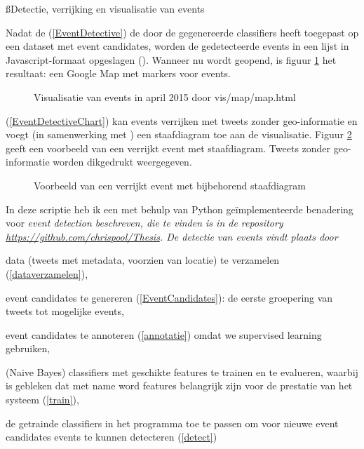 {{\ss{Detectie, verrijking en visualisatie van events}\label{detvervis}

Nadat de  (\ref{EventDetective}) de door de  gegenereerde classifiers heeft 
toegepast op een dataset met event candidates, worden de gedetecteerde events in een lijst in Javascript-formaat 
opgeslagen (). Wanneer nu  wordt geopend, is figuur \ref{standaardvis} het resultaat: een Google Map met
markers voor events.

\begin{figure}[H]
  \centering
    \caption{Visualisatie van events in april 2015 door vis/map/map.html}
  \label{standaardvis}
\end{figure}

 (\ref{EventDetectiveChart}) kan events verrijken met tweets zonder geo-informatie en voegt (in samenwerking
met ) een staafdiagram toe aan de visualisatie. Figuur \ref{verrijk} geeft een voorbeeld van een verrijkt event met staafdiagram.
Tweets zonder geo-informatie worden dikgedrukt weergegeven.

\begin{figure}[H]
  \centering
    \caption{Voorbeeld van een verrijkt event met bijbehorend staafdiagram}
  \label{verrijk}
\end{figure}

\label{conclusie}

In deze scriptie heb ik een met behulp van Python ge\"implementeerde benadering voor \it{event detection} beschreven, die te vinden is
in de repository \url{https://github.com/chrispool/Thesis}. 
\vl
De detectie van events vindt plaats door 

\begin{bullets}
\item data (tweets met metadata, voorzien van locatie) te verzamelen (\ref{dataverzamelen}),
\item event candidates te genereren (\ref{EventCandidates}): de eerste groepering van tweets tot mogelijke events,
\item event candidates te annoteren (\ref{annotatie}) omdat we supervised learning gebruiken,
\item (Naive Bayes) classifiers met geschikte features te trainen en te evalueren, waarbij is gebleken dat met name word features belangrijk
zijn voor de prestatie van het systeem (\ref{train}),
\item de getrainde classifiers in het programma toe te passen om voor nieuwe event candidates events te kunnen detecteren (\ref{detect})
\end{bullets}

}}
